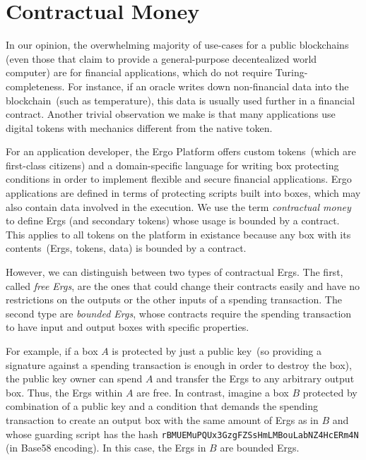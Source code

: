 

\section{Contractual Money}
    \label{sec:contractual}

 In our opinion, the overwhelming majority of use-cases for a public blockchains (even those that claim to provide a general-purpose decentealized world computer) are for financial applications, which do not require Turing-completeness. For instance, if an oracle writes down non-financial data into the blockchain~(such as temperature), this data is usually used further in a financial
 contract. Another trivial observation we make is that many applications use digital tokens with mechanics different from the native token.

For an application developer, the Ergo Platform offers custom tokens~(which are first-class citizens) and a domain-specific language for writing box protecting
 conditions in order to implement flexible and secure financial applications.
 Ergo applications are defined in terms of protecting scripts built into boxes, which may also contain data involved in the execution.
 We use the term {\em contractual money} to define Ergs (and secondary tokens) whose usage is bounded by a contract. This applies to all tokens on the platform in existance because any box with its contents~(Ergs, tokens, data) is bounded by a contract.
 
 However, we can distinguish between two types of contractual Ergs. The first, called {\em free Ergs}, are the ones that could change their contracts easily and have no restrictions on the outputs or the other inputs of a spending transaction. The second type are {\em bounded Ergs}, whose contracts require the spending transaction to have input and output boxes with specific properties. 
 
 For example, if a box $A$ is protected by just a public key~(so providing a signature against a spending transaction is enough in order to destroy the box), the public key owner can spend $A$ and transfer the Ergs to any arbitrary output box. Thus, the Ergs within $A$ are free. 
In contrast, imagine a box $B$ protected by combination of a public key and a condition that demands the spending transaction to create an output box with the same amount of Ergs as in $B$ and whose guarding script has the hash \texttt{rBMUEMuPQUx3GzgFZSsHmLMBouLabNZ4HcERm4N} (in Base58 encoding). In this case, the Ergs in $B$ are bounded Ergs.
 
